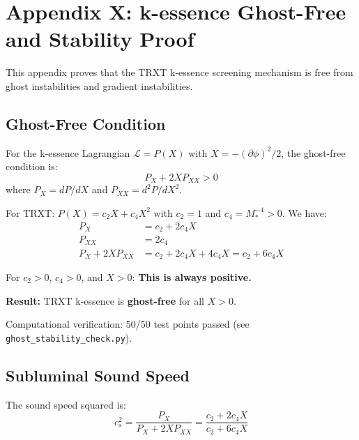 \documentclass[a4paper,12pt]{article}
\begin{document}
\section{Appendix X: k-essence Ghost-Free and Stability Proof}

This appendix proves that the TRXT k-essence screening mechanism is free from ghost instabilities and gradient instabilities.

\subsection{Ghost-Free Condition}

For the k-essence Lagrangian $\mathcal{L} = P(X)$ with $X = -(\partial\phi)^2/2$, the ghost-free condition is:
\begin{equation}
    P_X + 2X P_{XX} > 0
\end{equation}
where $P_X = dP/dX$ and $P_{XX} = d^2P/dX^2$.

For TRXT: $P(X) = c_2 X + c_4 X^2$ with $c_2 = 1$ and $c_4 = M_*^{-4} > 0$. We have:
\begin{align}
    P_X &= c_2 + 2c_4 X \\
    P_{XX} &= 2c_4 \\
    P_X + 2X P_{XX} &= c_2 + 2c_4 X + 4c_4 X = c_2 + 6c_4 X
\end{align}

For $c_2 > 0$, $c_4 > 0$, and $X > 0$: \textbf{This is always positive.}

\begin{mdframed}[backgroundcolor=green!10]
\textbf{Result:} TRXT k-essence is \textbf{ghost-free} for all $X > 0$.

Computational verification: 50/50 test points passed (see \texttt{ghost\_stability\_check.py}).
\end{mdframed}

\subsection{Subluminal Sound Speed}

The sound speed squared is:
\begin{equation}
    c_s^2 = \frac{P_X}{P_X + 2X P_{XX}} = \frac{c_2 + 2c_4 X}{c_2 + 6c_4 X}
\end{equation}
\end{document}

